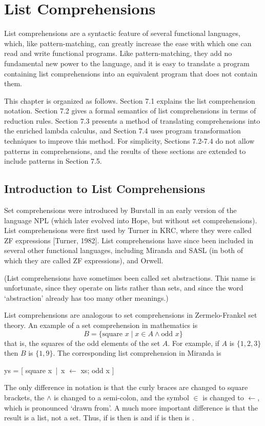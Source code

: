 \chapter{List Comprehensions}
\vspace{3cm}

List comprehensions are a syntactic feature of several functional languages,
which, like pattern-matching, can greatly increase the ease with which one
can read and write functional programs. Like pattern-matching, they add no
fundamental new power to the language, and it is easy to translate a program
containing list comprehensions into an equivalent program that does not
contain them.

This chapter is organized as follows. Section 7.1 explains the list comprehension notation. Section 7.2 gives a formal semantics of list comprehensions
in terms of reduction rules. Section 7.3 presents a method of translating
comprehensions into the enriched lambda calculus, and Section 7.4 uses
program transformation techniques to improve this method. For simplicity,
Sections 7.2-7.4 do not allow patterns in comprehensions, and the results of
these sections are extended to include patterns in Section 7.5.

\section{Introduction to List Comprehensions}
Set comprehensions were introduced by Burstall in an early version of the
language NPL (which later evolved into Hope, but without set comprehensions). List comprehensions were first used by Turner in KRC, where they
were called ZF expressions [Turner, 1982]. List comprehensions have since
been included in several other functional languages, including Miranda and
SASL (in both of which they are called ZF expressions), and Orwell.

(List comprehensions have sometimes been called set abstractions. This
name is unfortunate, since they operate on lists rather than sets, and since the
word `abstraction' already has too many other meanings.)

List comprehensions are analogous to set comprehensions in Zermelo-Frankel
set theory. An example of a set comprehension in mathematics is
\[ B = \{ \text{square } x \mid x \in A \wedge \text{odd } x \} \]
that is, the squares of the odd elements of the set $A$. For example, if $A$ is
$\{1,2,3\}$ then $B$ is $\{1,9\}$. The corresponding list comprehension in Miranda is
\begin{mlcoded}
    ys = [ square x\ |\ x $\leftarrow$ xs; odd x ]
\end{mlcoded}
The only difference in notation is that the curly braces are changed to square
brackets, the $\wedge$ is changed to a semi-colon, and the symbol $\in$ is changed to $\leftarrow$,
which is pronounced `drawn from'. A much more important difference is that
the result is a list, not a set. Thus, if  is \ml{[1,2,3]} then  is \ml{[1,9]} and if  is \ml{[3,2,1]}
then  is \ml{[9,1]}.

